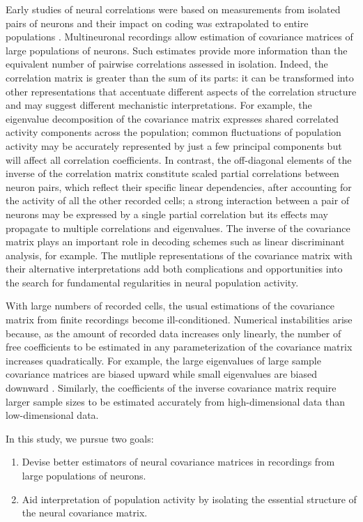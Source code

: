 Early studies of neural correlations were based on measurements from isolated pairs of neurons and their impact on coding was extrapolated to entire populations \citep{Shadlen:1998,Zohary:1994}.  Multineuronal recordings allow estimation of covariance matrices of large populations of neurons.  Such estimates provide more information than the equivalent number of pairwise correlations assessed in isolation. Indeed, the correlation matrix is greater than the sum of its parts: it can be transformed into other representations that accentuate different aspects of the correlation structure and may suggest different mechanistic interpretations. For example, the eigenvalue decomposition of the covariance matrix expresses shared correlated activity components across the population; common fluctuations of population activity may be accurately represented by just a few principal components but will affect all correlation coefficients. In contrast, the off-diagonal elements of the inverse of the correlation matrix constitute scaled partial correlations between neuron pairs, which reflect their specific linear dependencies, after accounting for the activity of all the other recorded cells; a strong interaction between a pair of neurons may be expressed by a single partial correlation but its effects may propagate to multiple correlations and eigenvalues.   The inverse of the covariance matrix plays an important role in decoding schemes such as linear discriminant analysis, for example.  The mutliple  representations of the covariance matrix with their alternative interpretations add both complications and opportunities into the search for fundamental regularities in neural population activity. 

With large numbers of recorded cells, the usual estimations of the covariance matrix from finite recordings become ill-conditioned. Numerical instabilities arise because, as the amount of recorded data increases only linearly, the number of free coefficients to be estimated in any parameterization of the covariance matrix increases quadratically. 
For example, the large eigenvalues of large sample covariance matrices are biased upward while small eigenvalues are biased downward \citep{Hayes:1981}. Similarly, the coefficients of the inverse covariance matrix require larger sample sizes to be estimated accurately from high-dimensional data than low-dimensional data.

In this study, we pursue two goals: 
\begin{enumerate}[\qquad A.\;\;]
	\item Devise better estimators of neural covariance matrices in recordings from large populations of neurons.
	\item Aid interpretation of population activity  by isolating the essential structure of the neural covariance matrix.
\end{enumerate}

